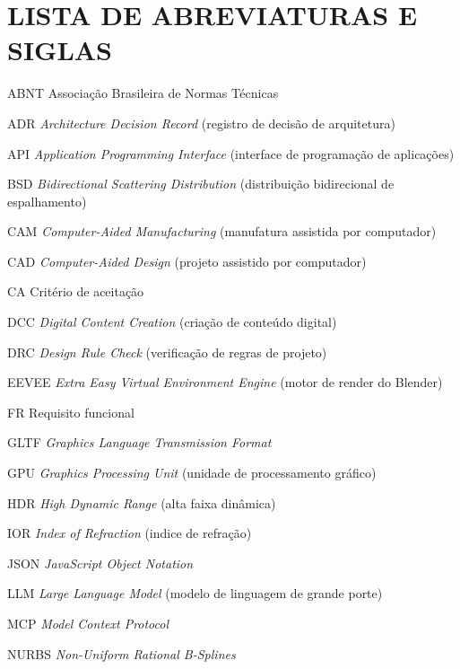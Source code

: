 \chapter*{LISTA DE ABREVIATURAS E SIGLAS}
\thispagestyle{plain}

\begin{abrev}
  \item[ABNT] Associa\c{c}\~ao Brasileira de Normas T\'ecnicas
  \item[ADR] \emph{Architecture Decision Record} (registro de decis\~ao de arquitetura)
  \item[API] \emph{Application Programming Interface} (interface de programa\c{c}\~ao de aplica\c{c}\~oes)
  \item[BSD] \emph{Bidirectional Scattering Distribution} (distribui\c{c}\~ao bidirecional de espalhamento)
  \item[CAM] \emph{Computer-Aided Manufacturing} (manufatura assistida por computador)
  \item[CAD] \emph{Computer-Aided Design} (projeto assistido por computador)
  \item[CA] Crit\'erio de aceita\c{c}\~ao
  \item[DCC] \emph{Digital Content Creation} (cria\c{c}\~ao de conte\'udo digital)
  \item[DRC] \emph{Design Rule Check} (verifica\c{c}\~ao de regras de projeto)
  \item[EEVEE] \emph{Extra Easy Virtual Environment Engine} (motor de render do Blender)
  \item[FR] Requisito funcional
  \item[GLTF] \emph{Graphics Language Transmission Format}
  \item[GPU] \emph{Graphics Processing Unit} (unidade de processamento gr\'afico)
  \item[HDR] \emph{High Dynamic Range} (alta faixa dinâmica)
  \item[IOR] \emph{Index of Refraction} (indice de refra\c{c}\~ao)
  \item[JSON] \emph{JavaScript Object Notation}
  \item[LLM] \emph{Large Language Model} (modelo de linguagem de grande porte)
  \item[MCP] \emph{Model Context Protocol}
  \item[NURBS] \emph{Non-Uniform Rational B-Splines}

\end{abrev}
